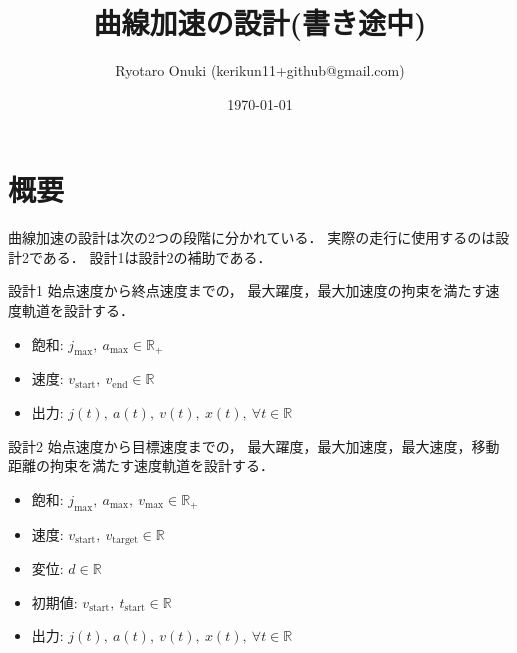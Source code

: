 \documentclass[a5paper]{ltjsarticle}
\title{曲線加速の設計(書き途中)}
\author{Ryotaro Onuki (kerikun11+github@gmail.com)}
\date{\today}
\begin{document}
\maketitle
\section{概要}
曲線加速の設計は次の2つの段階に分かれている．
実際の走行に使用するのは設計2である．
設計1は設計2の補助である．
\begin{itembox}[l]{設計1}
    \quad
    始点速度から終点速度までの，
    最大躍度，最大加速度の拘束を満たす速度軌道を設計する．
    \begin{itemize}
        \item 飽和: $j_{\max},~ a_{\max} \in \mathbb{R}_+$
        \item 速度: $v_\mathrm{start},~ v_\mathrm{end} \in \mathbb{R}$
        \item 出力: $j(t),~ a(t),~ v(t),~ x(t),~ \forall t \in \mathbb{R}$
    \end{itemize}
\end{itembox}
\begin{itembox}[l]{設計2}
    \quad
    始点速度から目標速度までの，
    最大躍度，最大加速度，最大速度，移動距離の拘束を満たす速度軌道を設計する．
    \begin{itemize}
        \item 飽和: $j_{\max},~ a_{\max},~ v_{\max} \in \mathbb{R}_+$
        \item 速度: $v_\mathrm{start},~ v_\mathrm{target} \in \mathbb{R}$
        \item 変位: $d \in \mathbb{R}$
        \item 初期値: $v_\mathrm{start},~ t_\mathrm{start} \in \mathbb{R}$
        \item 出力: $j(t),~ a(t),~ v(t),~ x(t),~ \forall t \in \mathbb{R}$
    \end{itemize}
\end{itembox}
\end{document}
